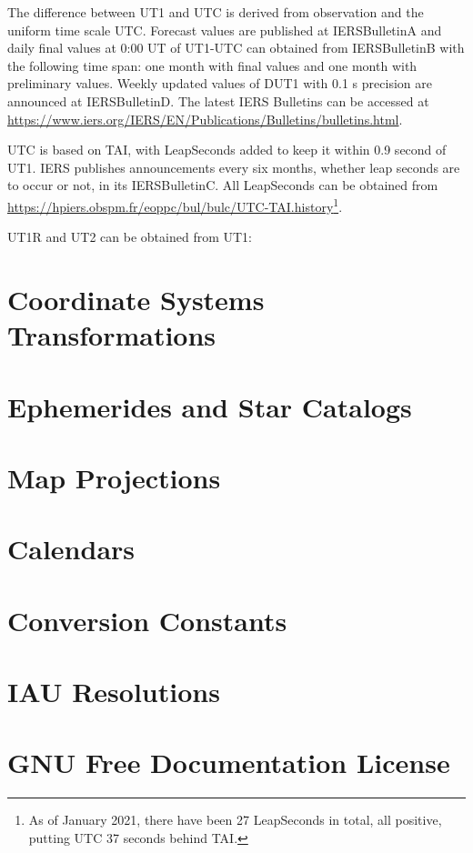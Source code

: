 \documentclass[a4paper,11pt,bibliography=totoc]{scrreport}
\begin{document}
The difference between \gls{UT1} and \gls{UTC} is derived from observation and the uniform time
scale \gls{UTC}. Forecast values are published at \gls{IERSBulletinA} and daily final values at 0:00 UT of UT1-UTC can obtained from \gls{IERSBulletinB} with the following time span: one month with final values and one month with preliminary values. Weekly updated values of DUT1 with 0.1 s precision are announced at \gls{IERSBulletinD}. The latest \gls{IERS} Bulletins can be accessed at \url{https://www.iers.org/IERS/EN/Publications/Bulletins/bulletins.html}.

\gls{UTC} is based on \gls{TAI}, with \glspl{LeapSecond} added to keep it within 0.9 second of \gls{UT1}. \gls{IERS} publishes announcements every six months, whether leap seconds are to occur or not, in its \gls{IERSBulletinC}. All \glspl{LeapSecond} can be obtained from \url{https://hpiers.obspm.fr/eoppc/bul/bulc/UTC-TAI.history}\footnote{As of January 2021, there have been 27 \glspl{LeapSecond} in total, all positive, putting \gls{UTC} 37 seconds behind \gls{TAI}.}.

\gls{UT1R} and \gls{UT2} can be obtained from \gls{UT1}:





\chapter{Coordinate Systems Transformations}\label{CoordinateSystemsTransformations}

\chapter{Ephemerides and Star Catalogs}\label{EphemeridesAndStarCatalogs}

\chapter{Map Projections}\label{MapProjections}

\chapter{Calendars}\label{Calendars}

\appendix
\chapter{Conversion Constants}\label{Conversion Constants}

\chapter{IAU Resolutions}\label{IAU Resolutions}
	
\chapter{GNU Free Documentation License}\label{License}



\printglossary
\end{document}
